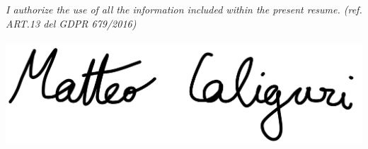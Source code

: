 \par
        \textit{I authorize the use of all the information included within the present resume. (ref. ART.13 del GDPR 679/2016)}\\
        \\
        \includegraphics[scale=0.08]{images/firma}
